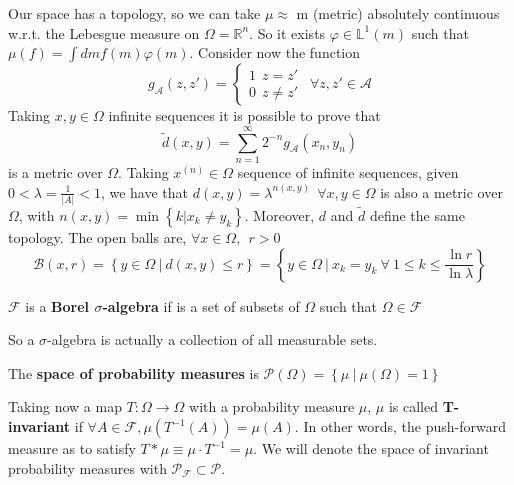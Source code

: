 Our space has a topology, so we can take $\mu \approx$ m (metric) absolutely continuous w.r.t. the Lebesgue measure on $\Omega = \mathbb{R}^n$.
So it exists $\varphi \in \mathbb{L}^1(m)$ such that $\mu(f) = \int dm f(m)\varphi(m)$.
Consider now the function
\begin{equation*}
    g_\mathcal{A}\left(z, z'\right) =
    \begin{cases}
        1 \ \ z = z' \\
        0 \ \ z \neq z'
    \end{cases}
    \ \ \forall z, z' \in \mathcal{A}
\end{equation*}
Taking $x, y \in \Omega$ infinite sequences it is possible to prove that
\begin{equation*}
    \widetilde{d}\left(x, y\right) = \sum_{n=1}^\infty 2^{-n} g_\mathcal{A}\left(x_n, y_n\right)
\end{equation*}
is a metric over $\Omega$.
Taking $x^{(n)} \in \Omega$ sequence of infinite sequences, given $0 < \lambda = \frac{1}{\left\lvert A\right\rvert} < 1$, we have that $d(x, y) = \lambda^{n\left(x, y\right)} \ \ \forall x, y \in \Omega$ is also a metric over $\Omega$, with $n(x, y) = \min\left\{k \vert x_k \neq y_k\right\}$.
Moreover, $d$ and $\widetilde{d}$ define the same topology.
The open balls are, $\forall x \in \Omega, \ \ r > 0$
\begin{equation*}
    \mathcal{B}\left(x, r\right) =  \left\{y \in \Omega \ \vert \ d(x, y) \leq r\right\} = \left\{y \in \Omega \ \vert \ x_k = y_k \ \forall \ 1 \leq k \leq \frac{\ln r}{\ln \lambda}\right\}
\end{equation*}
\begin{definition}
    $\mathcal{F}$ is a \textbf{Borel $\sigma$-algebra} if is a set of subsets of $\Omega$ such that $\Omega \in \mathcal{F}$
\end{definition}
So a $\sigma$-algebra is actually a collection of all measurable sets.
\begin{definition}
    The \textbf{space of probability measures} is $\mathcal{P}\left(\Omega\right) = \left\{\mu \ \vert \ \mu\left(\Omega\right) = 1\right\}$
\end{definition}
Taking now a map $T : \Omega \to \Omega$ with a probability measure $\mu$, $\mu$ is called \textbf{T-invariant} if $\forall A \in \mathcal{F}, \mu\left(T^{-1}\left(A\right)\right) = \mu\left(A\right)$.
In other words, the push-forward measure as to satisfy $T * \mu \equiv \mu \cdot T^{-1} = \mu$.
We will denote the space of invariant probability measures with $\mathcal{P}_\mathcal{F} \subset \mathcal{P}$.

